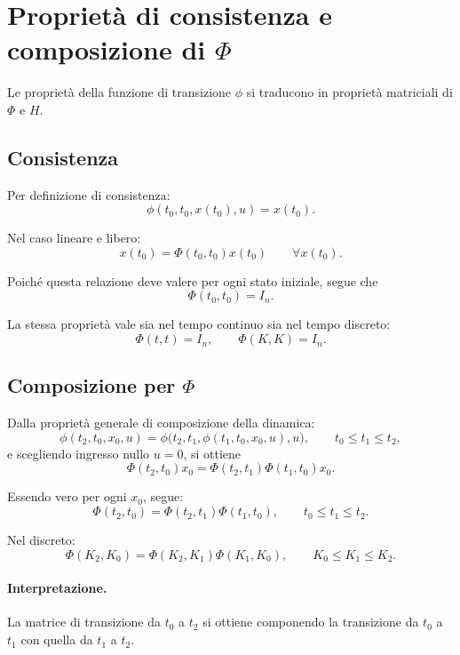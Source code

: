 \section{Proprietà di consistenza e composizione di \texorpdfstring{$\Phi$}{Phi}}

Le proprietà della funzione di transizione $\phi$ si traducono in proprietà matriciali di $\Phi$ e $H$.

\subsection{Consistenza}

Per definizione di consistenza:
\[
\phi(t_0,t_0,x(t_0),u)=x(t_0).
\]

Nel caso lineare e libero:
\[
x(t_0)=\Phi(t_0,t_0)x(t_0)\qquad \forall x(t_0).
\]

Poiché questa relazione deve valere per ogni stato iniziale, segue che
\begin{equation}
\Phi(t_0,t_0)=I_n.
\label{eq:L3_consistency_Phi}
\end{equation}

La stessa proprietà vale sia nel tempo continuo sia nel tempo discreto:
\[
\Phi(t,t)=I_n,
\qquad
\Phi(K,K)=I_n.
\]

\subsection{Composizione per \texorpdfstring{$\Phi$}{Phi}}

Dalla proprietà generale di composizione della dinamica:
\[
\phi(t_2,t_0,x_0,u)=\phi\bigl(t_2,t_1,\phi(t_1,t_0,x_0,u),u\bigr),
\qquad t_0\le t_1\le t_2,
\]
e scegliendo ingresso nullo $u=0$, si ottiene
\[
\Phi(t_2,t_0)x_0=\Phi(t_2,t_1)\Phi(t_1,t_0)x_0.
\]

Essendo vero per ogni $x_0$, segue:
\begin{equation}
\Phi(t_2,t_0)=\Phi(t_2,t_1)\Phi(t_1,t_0),
\qquad t_0\le t_1\le t_2.
\label{eq:L3_composition_Phi_TC}
\end{equation}

Nel discreto:
\begin{equation}
\Phi(K_2,K_0)=\Phi(K_2,K_1)\Phi(K_1,K_0),
\qquad K_0\le K_1\le K_2.
\label{eq:L3_composition_Phi_TD}
\end{equation}

\paragraph{Interpretazione.}
La matrice di transizione da $t_0$ a $t_2$ si ottiene componendo la transizione da $t_0$ a $t_1$ con quella da $t_1$ a $t_2$.

